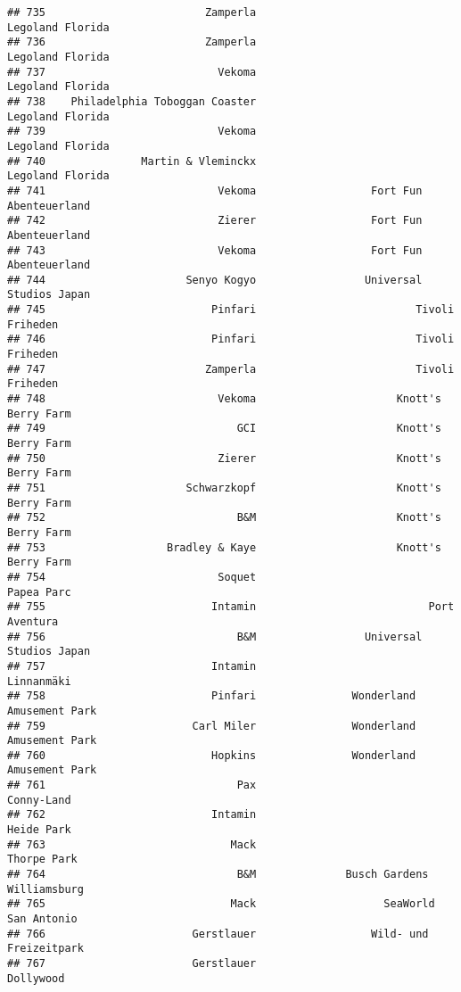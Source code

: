\documentclass[
]{article}
\begin{document}
\begin{verbatim}
## 735                         Zamperla                        Legoland Florida
## 736                         Zamperla                        Legoland Florida
## 737                           Vekoma                        Legoland Florida
## 738    Philadelphia Toboggan Coaster                        Legoland Florida
## 739                           Vekoma                        Legoland Florida
## 740               Martin & Vleminckx                        Legoland Florida
## 741                           Vekoma                  Fort Fun Abenteuerland
## 742                           Zierer                  Fort Fun Abenteuerland
## 743                           Vekoma                  Fort Fun Abenteuerland
## 744                      Senyo Kogyo                 Universal Studios Japan
## 745                          Pinfari                         Tivoli Friheden
## 746                          Pinfari                         Tivoli Friheden
## 747                         Zamperla                         Tivoli Friheden
## 748                           Vekoma                      Knott's Berry Farm
## 749                              GCI                      Knott's Berry Farm
## 750                           Zierer                      Knott's Berry Farm
## 751                      Schwarzkopf                      Knott's Berry Farm
## 752                              B&M                      Knott's Berry Farm
## 753                   Bradley & Kaye                      Knott's Berry Farm
## 754                           Soquet                              Papea Parc
## 755                          Intamin                           Port Aventura
## 756                              B&M                 Universal Studios Japan
## 757                          Intamin                              Linnanmäki
## 758                          Pinfari               Wonderland Amusement Park
## 759                       Carl Miler               Wonderland Amusement Park
## 760                          Hopkins               Wonderland Amusement Park
## 761                              Pax                              Conny-Land
## 762                          Intamin                              Heide Park
## 763                             Mack                             Thorpe Park
## 764                              B&M              Busch Gardens Williamsburg
## 765                             Mack                    SeaWorld San Antonio
## 766                       Gerstlauer                  Wild- und Freizeitpark
## 767                       Gerstlauer                               Dollywood

\end{verbatim}
\end{document}
